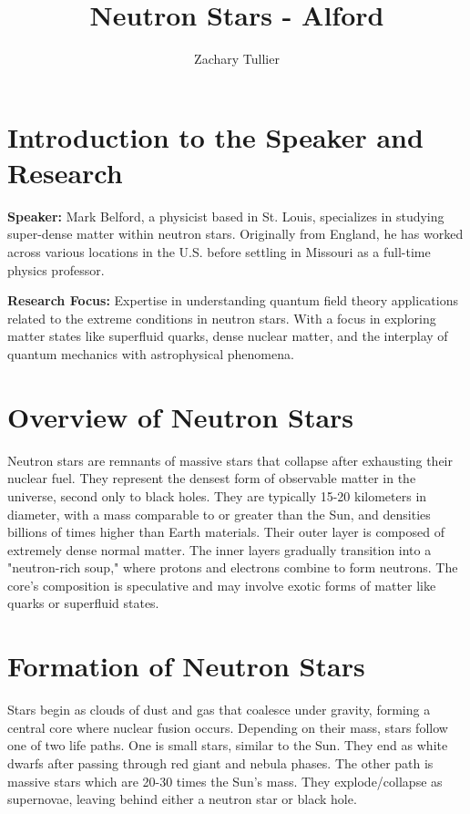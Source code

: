 \documentclass[12pt]{article}
\begin{document}
\singlespacing  %
\title{Neutron Stars - Alford}

\author[1]{Zachary Tullier}
\date{}
\maketitle



\section{Introduction to the Speaker and Research}
\textbf{Speaker:} Mark Belford, a physicist based in St. Louis, specializes in studying super-dense matter within neutron stars. Originally from England, he has worked across various locations in the U.S. before settling in Missouri as a full-time physics professor.

\textbf{Research Focus:}
    Expertise in understanding quantum field theory applications related to the extreme conditions in neutron stars. With a focus in exploring matter states like superfluid quarks, dense nuclear matter, and the interplay of quantum mechanics with astrophysical phenomena.

\section{Overview of Neutron Stars}
    Neutron stars are remnants of massive stars that collapse after exhausting their nuclear fuel. They represent the densest form of observable matter in the universe, second only to black holes. They are typically 15-20 kilometers in diameter, with a mass comparable to or greater than the Sun, and densities billions of times higher than Earth materials.
    Their outer layer is composed of extremely dense normal matter. The inner layers gradually transition into a "neutron-rich soup," where protons and electrons combine to form neutrons.
    The core's composition is speculative and may involve exotic forms of matter like quarks or superfluid states.


\section{Formation of Neutron Stars}
    Stars begin as clouds of dust and gas that coalesce under gravity, forming a central core where nuclear fusion occurs. Depending on their mass, stars follow one of two life paths. One is small stars, similar to the Sun. They end as white dwarfs after passing through red giant and nebula phases. The other path is massive stars which are 20-30 times the Sun’s mass. They explode/collapse as supernovae, leaving behind either a neutron star or black hole.
\end{document}

